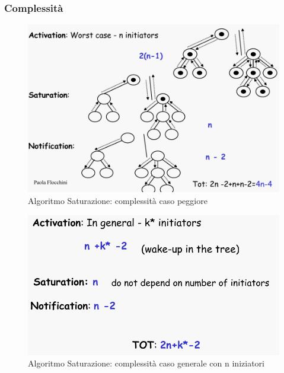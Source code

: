 \documentclass[12pt]{article}
\begin{document}
		\subsubsection{Complessità}
			\begin{figure}[h!]
				\centering
				\includegraphics[scale=0.3]{img/satmess.png}
				\caption{Algoritmo Saturazione: complessità caso peggiore}
			\end{figure}
			\begin{figure}[h!]
				\centering
				\includegraphics[scale=0.3]{img/satmess2.png}
				\caption{Algoritmo Saturazione: complessità caso generale con n iniziatori}
			\end{figure}
		
\end{document}
